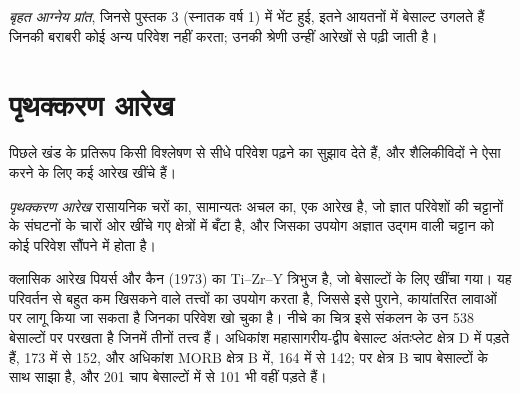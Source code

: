\emph{बृहत आग्नेय प्रांत}, जिनसे पुस्तक 3 (स्नातक वर्ष 1) में भेंट हुई, इतने आयतनों में बेसाल्ट उगलते हैं
जिनकी बराबरी कोई अन्य परिवेश नहीं करता; उनकी श्रेणी उन्हीं आरेखों से पढ़ी जाती है।

\section{पृथक्करण आरेख}\label{sec:b2:magmatic-series:discrimination}

पिछले खंड के प्रतिरूप किसी विश्लेषण से सीधे परिवेश पढ़ने का सुझाव देते हैं,
और शैलिकीविदों ने ऐसा करने के लिए कई आरेख खींचे हैं।

\begin{definition}[पृथक्करण आरेख]\label{def:b2:magmatic-series:discrimination}
\emph{पृथक्करण आरेख} रासायनिक चरों का, सामान्यतः
अचल  का, एक आरेख है, जो ज्ञात परिवेशों की चट्टानों के संघटनों के चारों ओर खींचे गए
क्षेत्रों में बँटा है, और जिसका उपयोग अज्ञात उद्गम वाली चट्टान को कोई परिवेश
सौंपने में होता है।
\end{definition}

क्लासिक आरेख पियर्स और कैन (1973) का Ti--Zr--Y त्रिभुज है, जो बेसाल्टों के लिए खींचा गया। यह
परिवर्तन से बहुत कम खिसकने वाले तत्त्वों का उपयोग करता है, जिससे इसे पुराने,
कायांतरित लावाओं पर लागू किया जा सकता है जिनका परिवेश खो चुका है। नीचे का चित्र इसे संकलन के उन 538 बेसाल्टों पर परखता है
जिनमें तीनों तत्त्व हैं। अधिकांश महासागरीय-द्वीप बेसाल्ट
अंतःप्लेट क्षेत्र D में पड़ते हैं, 173 में से 152, और अधिकांश MORB क्षेत्र B में, 164 में से 142; पर क्षेत्र B
चाप बेसाल्टों के साथ साझा है, और 201 चाप बेसाल्टों में से 101 भी वहीं पड़ते हैं।


